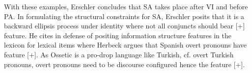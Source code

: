 With these examples, Erschler concludes that SA takes place after VI and before PA. In formulating the structural constraints for SA, Erschler posits that it is a backward ellipsis process under identity where not all conjuncts should bear \textsc{[+{\Emp}]} feature. He cites \cite{herbeck2016controlling} in defense of positing information structure features in the lexicon for lexical items where Herbeck argues that Spanish overt pronouns have feature \textsc{[+{\Foc}]}. As Ossetic is a pro-drop language like Turkish, cf. \cite{ozturk2002turkish} overt Turkish pronouns, overt pronouns need to be discourse configured hence the feature \textsc{[+{\Emp}]}. 

    
    
